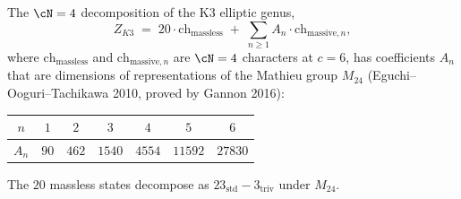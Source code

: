 \begin{theorem}
\label{thm:mathieu-moonshine}
The $\cN = 4$ decomposition of the K3 elliptic genus,
\begin{equation}\label{eq:mathieu-decomposition}
Z_{K3} \;=\; 20 \cdot \mathrm{ch}_{\mathrm{massless}}
\;+\; \sum_{n \geq 1} A_n \cdot \mathrm{ch}_{\mathrm{massive},n},
\end{equation}
where $\mathrm{ch}_{\mathrm{massless}}$ and
$\mathrm{ch}_{\mathrm{massive},n}$ are $\cN = 4$ characters at
$c = 6$, has coefficients $A_n$ that are dimensions of
representations of the Mathieu group $M_{24}$
\textup{(}Eguchi--Ooguri--Tachikawa 2010, proved by Gannon
2016\textup{)}:
\begin{center}
\small
\renewcommand{\arraystretch}{1.2}
\begin{tabular}{ccccccc}
$n$ & $1$ & $2$ & $3$ & $4$ & $5$ & $6$ \\
\hline
$A_n$ & $90$ & $462$ & $1540$ & $4554$ & $11592$ & $27830$
\end{tabular}
\end{center}
The $20$ massless states decompose as
$23_{\mathrm{std}} - 3_{\mathrm{triv}}$ under $M_{24}$.
\end{theorem}

